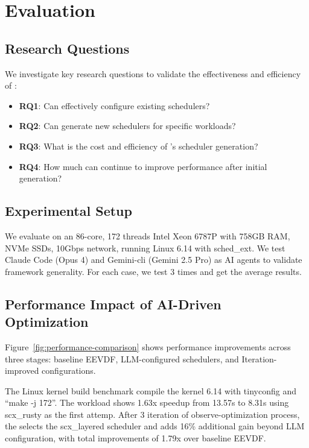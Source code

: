 \section{Evaluation}
\label{sec:evaluation}

\subsection{Research Questions}

We investigate key research questions to validate the effectiveness and efficiency of \sys:

\begin{itemize}
\item \textbf{RQ1}: Can \sys effectively configure existing schedulers?
\item \textbf{RQ2}: Can \sys generate new schedulers for specific workloads?
\item \textbf{RQ3}: What is the cost and efficiency of \sys's scheduler generation?
\item \textbf{RQ4}: How much can \agent continue to improve performance after initial generation?
\end{itemize}

\subsection{Experimental Setup}

We evaluate \sys on an 86-core, 172 threads Intel Xeon 6787P with 758GB RAM, NVMe SSDs, 10Gbps network, running Linux 6.14 with sched\_ext. We test Claude Code (Opus 4) and Gemini-cli (Gemini 2.5 Pro) as AI agents to validate framework generality. For each case, we test 3 times and get the average results.

\subsection{Performance Impact of AI-Driven Optimization}

Figure~\ref{fig:performance-comparison} shows performance improvements across three stages: baseline EEVDF, LLM-configured schedulers, and Iteration-improved configurations. 


The Linux kernel build benchmark compile the kernel 6.14 with tinyconfig and ``make -j 172''. The workload shows 1.63x speedup from 13.57s to 8.31s using scx\_rusty as the first attemp. After 3 iteration of observe-optimization process, the \agent selects the scx\_layered scheduler and adds 16\% additional gain beyond LLM configuration, with total improvements of 1.79x over baseline EEVDF.

